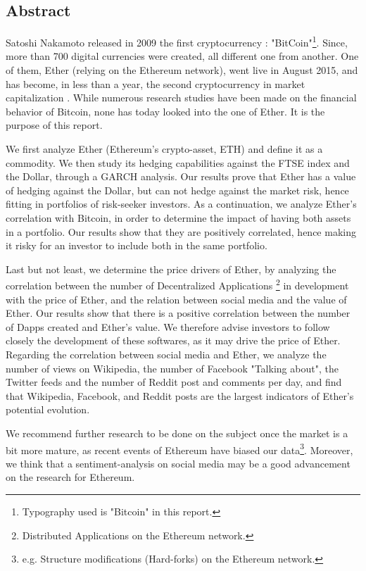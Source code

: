\documentclass[11pt]{report}
\begin{document}
\begin{spacing}{1.0}
\chapter*{Abstract}

Satoshi Nakamoto released in 2009 the first cryptocurrency : "BitCoin"\footnote{Typography used is "Bitcoin" in this report.}. Since, more than 700 digital currencies were created, all different one from another. One of them, Ether (relying on the Ethereum network), went live in August 2015, and has become, in less than a year, the second cryptocurrency in market capitalization \cite{CRYPTOCOMPARE}. While numerous research studies have been made on the financial behavior of Bitcoin, none has today looked into the one of Ether. It is the purpose of this report.\newline

We first analyze Ether (Ethereum's crypto-asset, ETH) and define it as a commodity. We then study its hedging capabilities against the FTSE index and the Dollar, through a GARCH analysis. Our results prove that Ether has a value of hedging against the Dollar, but can not hedge against the market risk, hence fitting in portfolios of risk-seeker investors. As a continuation, we analyze Ether's correlation with Bitcoin, in order to determine the impact of having both assets in a portfolio. Our results show that they are positively correlated, hence making it risky for an investor to include both in the same portfolio. \newline

Last but not least, we determine the price drivers of Ether, by analyzing the correlation between the number of Decentralized  Applications \footnote{Distributed Applications on the Ethereum network.} in development with the price of Ether, and the relation between social media and the value of Ether. Our results show that there is a positive correlation between the number of Dapps created and Ether's value. We therefore advise investors to follow closely the development of these softwares, as it may drive the price of Ether. Regarding the correlation between social media and Ether, we analyze the number of views on Wikipedia, the number of Facebook "Talking about", the Twitter feeds and the number of Reddit post and comments per day, and find that Wikipedia, Facebook, and Reddit posts are the largest indicators of Ether's potential evolution. \newline

We recommend further research to be done on the subject once the market is a bit more mature, as recent events of Ethereum have biased our data\footnote{e.g. Structure modifications (Hard-forks) on the Ethereum network.}. Moreover, we think that a sentiment-analysis on social media may be a good advancement on the research for Ethereum.
\end{spacing}
\begin{spacing}{1.0}
{\small\tableofcontents}
\end{spacing}
\end{document}
